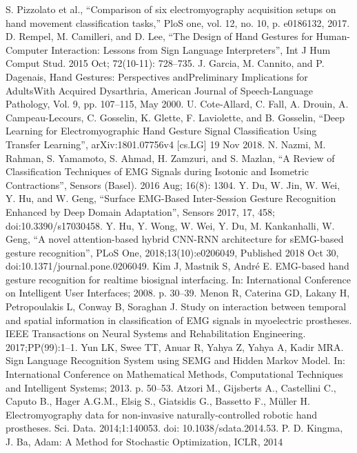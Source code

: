 \documentclass[conference]{IEEEtran}
\begin{document}
{\begin{minipage}{\textwidth}
\begin{thebibliography}{00}
 S. Pizzolato et al., ``Comparison of six electromyography acquisition setups on hand movement classification tasks,'' PloS one, vol. 12, no. 10, p. e0186132, 2017.
 D. Rempel, M. Camilleri, and D. Lee, ``The Design of Hand Gestures for Human-Computer Interaction: Lessons from Sign Language Interpreters'', Int J Hum Comput Stud. 2015 Oct; 72(10-11): 728–735.
 J. Garcia, M. Cannito, and P. Dagenais, Hand Gestures: Perspectives andPreliminary Implications for AdultsWith Acquired Dysarthria, American Journal of Speech-Language Pathology, Vol. 9,  pp. 107–115, May 2000.
 U. Cote-Allard, C. Fall, A. Drouin, A. Campeau-Lecours, C. Gosselin, K. Glette, F. Laviolette, and B. Gosselin, ``Deep Learning for Electromyographic Hand Gesture Signal Classification Using Transfer Learning'', arXiv:1801.07756v4 [cs.LG] 19 Nov 2018.
 N. Nazmi, M. Rahman, S. Yamamoto, S. Ahmad, H. Zamzuri, and S. Mazlan, ``A Review of Classification Techniques of EMG Signals during Isotonic and Isometric Contractions'', Sensors (Basel). 2016 Aug; 16(8): 1304.
 Y. Du, W. Jin, W. Wei, Y. Hu, and W. Geng, ``Surface EMG-Based Inter-Session Gesture Recognition Enhanced by Deep Domain Adaptation'', Sensors 2017, 17, 458; doi:10.3390/s17030458.
 Y. Hu, Y. Wong, W. Wei, Y. Du, M. Kankanhalli, W. Geng, ``A novel attention-based hybrid CNN-RNN architecture for sEMG-based gesture recognition'', PLoS One, 2018;13(10):e0206049, Published 2018 Oct 30, doi:10.1371/journal.pone.0206049.
 Kim J, Mastnik S, André E. EMG-based hand gesture recognition for realtime biosignal interfacing. In: International Conference on Intelligent User Interfaces; 2008. p. 30–39.
 Menon R, Caterina GD, Lakany H, Petropoulakis L, Conway B, Soraghan J. Study on interaction between temporal and spatial information in classification of EMG signals in myoelectric prostheses. IEEE Transactions on Neural Systems and Rehabilitation Engineering. 2017;PP(99):1–1.
 Yun LK, Swee TT, Anuar R, Yahya Z, Yahya A, Kadir MRA. Sign Language Recognition System using SEMG and Hidden Markov Model. In: International Conference on Mathematical Methods, Computational Techniques and Intelligent Systems; 2013. p. 50–53.
 Atzori M., Gijsberts A., Castellini C., Caputo B., Hager A.G.M., Elsig S., Giatsidis G., Bassetto F., Müller H. Electromyography data for non-invasive naturally-controlled robotic hand prostheses. Sci. Data. 2014;1:140053. doi: 10.1038/sdata.2014.53.
 P. D. Kingma, J. Ba, Adam: A Method for Stochastic Optimization, ICLR, 2014


\end{thebibliography}
\end{minipage}}
\end{document}
